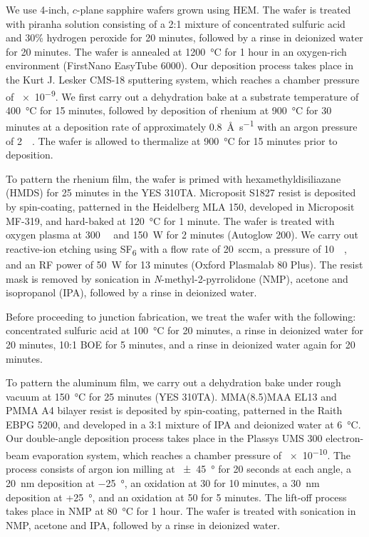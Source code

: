 \documentclass[
    reprint,
    superscriptaddress,
    amsmath,amssymb,
    aps,
    prb,
    floatfix,
]{revtex4-2}
\begin{document}
We use 4-inch, $c$-plane sapphire wafers grown using HEM. The wafer is treated with piranha solution consisting of a 2:1 mixture of concentrated sulfuric acid and 30\% hydrogen peroxide for 20 minutes, followed by a rinse in deionized water for 20 minutes. The wafer is annealed at \SI{1200}{\celsius} for 1 hour in an oxygen-rich environment (FirstNano EasyTube 6000). Our deposition process takes place in the Kurt J. Lesker CMS-18 sputtering system, which reaches a chamber pressure of \SI{e-9}{\torr}. We first carry out a dehydration bake at a substrate temperature of \SI{400}{\celsius} for 15 minutes, followed by deposition of rhenium at \SI{900}{\celsius} for 30 minutes at a deposition rate of approximately \SI{0.8}{\angstrom\per\second} with an argon pressure of \SI{2}{\milli\torr}. The wafer is allowed to thermalize at \SI{900}{\celsius} for 15 minutes prior to deposition.

To pattern the rhenium film, the wafer is primed with hexamethyldisiliazane (HMDS) for 25 minutes in the YES 310TA. Microposit S1827 resist is deposited by spin-coating, patterned in the Heidelberg MLA 150, developed in Microposit MF-319, and hard-baked at \SI{120}{\celsius} for 1 minute. The wafer is treated with oxygen plasma at \SI{300}{\milli\torr} and \SI{150}{\watt} for 2 minutes (Autoglow 200). We carry out reactive-ion etching using SF\textsubscript{6} with a flow rate of \SI{20}{sccm}, a pressure of \SI{10}{\milli\torr}, and an RF power of \SI{50}{\watt} for 13 minutes (Oxford Plasmalab 80 Plus). The resist mask is removed by sonication in \textit{N}-methyl-2-pyrrolidone (NMP), acetone and isopropanol (IPA), followed by a rinse in deionized water.

Before proceeding to junction fabrication, we treat the wafer with the following: concentrated sulfuric acid at \SI{100}{\celsius} for 20 minutes, a rinse in deionized water for 20 minutes, 10:1 BOE for 5 minutes, and a rinse in deionized water again for 20 minutes.

To pattern the aluminum film, we carry out a dehydration bake under rough vacuum at \SI{150}{\celsius} for 25 minutes (YES 310TA). MMA(8.5)MAA EL13 and PMMA A4 bilayer resist is deposited by spin-coating, patterned in the Raith EBPG 5200, and developed in a 3:1 mixture of IPA and deionized water at \SI{6}{\celsius}. Our double-angle deposition process takes place in the Plassys UMS 300 electron-beam evaporation system, which reaches a chamber pressure of \SI{e-10}{\torr}. The process consists of argon ion milling at \SI{\pm45}{\degree} for 20 seconds at each angle, a \SI{20}{\nano\meter} deposition at \SI{-25}{\degree}, an oxidation at \SI{30}{\torr} for 10 minutes, a \SI{30}{\nano\meter} deposition at +\SI{25}{\degree}, and an oxidation at \SI{50}{\torr} for 5 minutes. The lift-off process takes place in NMP at \SI{80}{\celsius} for 1 hour. The wafer is treated with sonication in NMP, acetone and IPA, followed by a rinse in deionized water.
\end{document}
